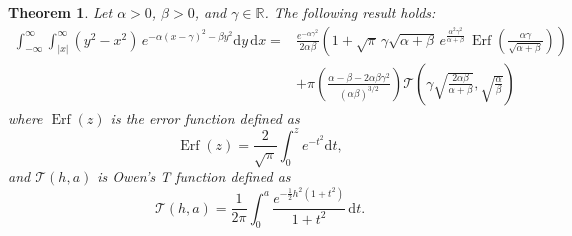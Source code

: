 \documentclass[journal]{IEEEtran}
\theoremstyle{plain}
\newtheorem{theorem}{Theorem}[section]
\theoremstyle{definition}
\theoremstyle{remark}
\newcommand{\R}{\mathbb{R}}
\newcommand{\Ot}{\mathcal{T}}
\newcommand{\Erf}{\operatorname{Erf}}
\newcommand{\dd}{\mathrm{d}}
\begin{document}
\begin{theorem} \label{thrm:integral_main}
Let $\alpha > 0$, $\beta > 0$, and $\gamma \in \R$. The following result holds:
\begin{equation}
\begin{split}
 \int_{-\infty}^\infty \int_{|x|}^\infty (y^2-x^2) \, e^{-\alpha(x-\gamma)^2-\beta y^2} \dd y \, \dd x =& \frac{e^{-\alpha \gamma^2}}{2\alpha\beta} \left(1 + \sqrt{\pi} \, \gamma \sqrt{\alpha + \beta} \, e^{\frac{\alpha^2 \gamma^2}{\alpha + \beta}} \, \Erf\left(\frac{\alpha \gamma}{\sqrt{\alpha + \beta}}\right)\right) \\&
    + \pi \left(\frac{\alpha - \beta - 2\alpha\beta\gamma^2}{(\alpha\beta)^{3/2}}\right) \Ot\left(\gamma\sqrt{\frac{2\alpha\beta}{\alpha+\beta}}, \sqrt{\frac{\alpha}{\beta}}\right)
\end{split} \label{eq:main_theorem_equation}
\end{equation}
where $\Erf(z)$ is the error function defined as
\begin{equation}
\Erf(z) = \frac{2}{\sqrt{\pi}} \int_0^z e^{-t^2}  \dd t, \label{eq:erf_defn_appendix}
\end{equation}
and $\Ot(h, a)$ is Owen's T function \cite{owen1980table} defined as
\begin{equation}
\Ot(h, a) = \frac{1}{2\pi} \int_0^a \frac{e^{-\frac{1}{2}h^2(1+t^2)}}{1+t^2} \, \dd t. \label{eq:Ot_defn_appendix}
\end{equation}
\end{theorem}
\end{document}
